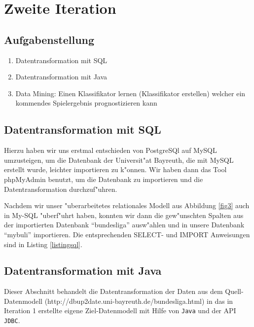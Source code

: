 \documentclass[
10pt,
a4paper
]{scrartcl}
\begin{document}
\section{ Zweite Iteration}

\subsection{Aufgabenstellung}

\begin{enumerate}
  \item Datentransformation mit SQL  
  \item Datentransformation mit Java
  \item Data Mining: Einen Klassifikator lernen (Klassifikator erstellen) welcher ein kommendes Spielergebnis prognostizieren kann
\end{enumerate}

\subsection{Datentransformation mit SQL}
Hierzu haben wir uns erstmal entschieden von PostgreSQl auf MySQL umzusteigen, um die Datenbank der Universit"at Bayreuth, die mit MySQL erstellt wurde, leichter importieren zu k"onnen. Wir haben dann das Tool phpMyAdmin benutzt, um die Datenbank zu importieren und die Datentransformation durchzuf"uhren.

Nachdem wir unser "uberarbeitetes relationales Modell aus Abbildung \ref{fig3} auch in My{-}SQL "uberf"uhrt haben, konnten wir dann die gew"unschten Spalten aus der importierten Datenbank "`bundesliga"' ausw"ahlen und in unsere Datenbank "`mybuli"' importieren. Die entsprechenden SELECT- und IMPORT Anweisungen sind in Listing \ref{listingsql}.



\subsection{Datentransformation mit Java}

Dieser Abschnitt behandelt die Datentransformation der Daten aus dem Quell-Datenmodell (http://dbup2date.uni-bayreuth.de/bundesliga.html) in das in Iteration 1 erstellte eigene Ziel-Datenmodell mit Hilfe von \texttt{Java} und der API \texttt{JDBC}.\\
\end{document}
